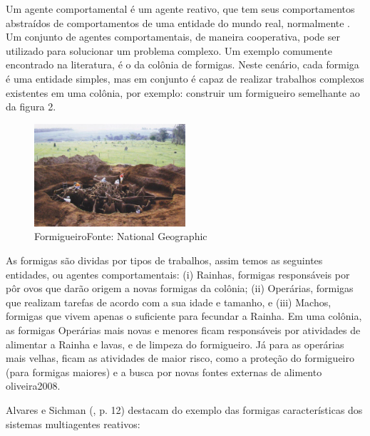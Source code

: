 Um agente comportamental é um agente reativo, que tem seus comportamentos abstraídos de comportamentos de uma entidade do mundo real, normalmente \cite[p. 33]{oliveira2008}. Um conjunto de agentes comportamentais, de maneira cooperativa, pode ser utilizado para solucionar um problema complexo. Um exemplo comumente encontrado na literatura, é o da colônia de formigas. Neste cenário, cada formiga é uma entidade simples, mas em conjunto é capaz de realizar trabalhos complexos existentes em uma colônia, por exemplo: construir um formigueiro semelhante ao da figura 2.

\begin{figure}[h]
\centering
\label{f02}
\includegraphics[width=0.5\textwidth]{figuras/f02}
\caption{Formigueiro\newline Fonte: National Geographic}

\end{figure}

As formigas são dividas por tipos de trabalhos, assim temos as seguintes entidades, ou agentes comportamentais: (i) Rainhas, formigas responsáveis por pôr ovos que darão origem a novas formigas da colônia; (ii) Operárias, formigas que realizam tarefas de acordo com a sua idade e tamanho, e (iii) Machos, formigas que vivem apenas o suficiente para fecundar a Rainha. Em uma colônia, as formigas Operárias mais novas e menores ficam responsáveis por atividades de alimentar a Rainha e lavas, e de limpeza do formigueiro. Já para as operárias mais velhas, ficam as atividades de maior risco, como a proteção do formigueiro (para formigas maiores) e a busca por novas fontes externas de alimento  {oliveira2008}.

Alvares e Sichman (\citeyear{alvares1997}, p. 12) destacam do exemplo das formigas características dos sistemas multiagentes reativos:

